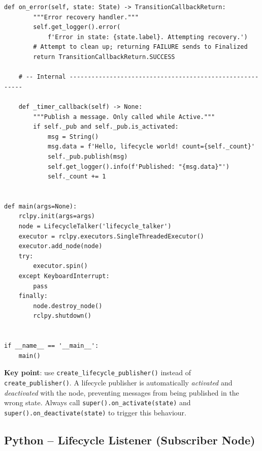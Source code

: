 \documentclass[12pt,a4paper]{article}
\newcommand{\code}[1]{\texttt{#1}}
\begin{document}
\begin{lstlisting}[style=python,caption={lifecycle\_talker.py -- full example}]
    def on_error(self, state: State) -> TransitionCallbackReturn:
        """Error recovery handler."""
        self.get_logger().error(
            f'Error in state: {state.label}. Attempting recovery.')
        # Attempt to clean up; returning FAILURE sends to Finalized
        return TransitionCallbackReturn.SUCCESS

    # -- Internal ---------------------------------------------------------

    def _timer_callback(self) -> None:
        """Publish a message. Only called while Active."""
        if self._pub and self._pub.is_activated:
            msg = String()
            msg.data = f'Hello, lifecycle world! count={self._count}'
            self._pub.publish(msg)
            self.get_logger().info(f'Published: "{msg.data}"')
            self._count += 1


def main(args=None):
    rclpy.init(args=args)
    node = LifecycleTalker('lifecycle_talker')
    executor = rclpy.executors.SingleThreadedExecutor()
    executor.add_node(node)
    try:
        executor.spin()
    except KeyboardInterrupt:
        pass
    finally:
        node.destroy_node()
        rclpy.shutdown()


if __name__ == '__main__':
    main()
\end{lstlisting}

\begin{notebox}
  \textbf{Key point}: use \code{create\_lifecycle\_publisher()} instead of
  \code{create\_publisher()}.  A lifecycle publisher is automatically
  \emph{activated} and \emph{deactivated} with the node, preventing messages
  from being published in the wrong state.  Always call
  \code{super().on\_activate(state)} and \code{super().on\_deactivate(state)}
  to trigger this behaviour.
\end{notebox}

\subsection{Python -- Lifecycle Listener (Subscriber Node)}
\end{document}
